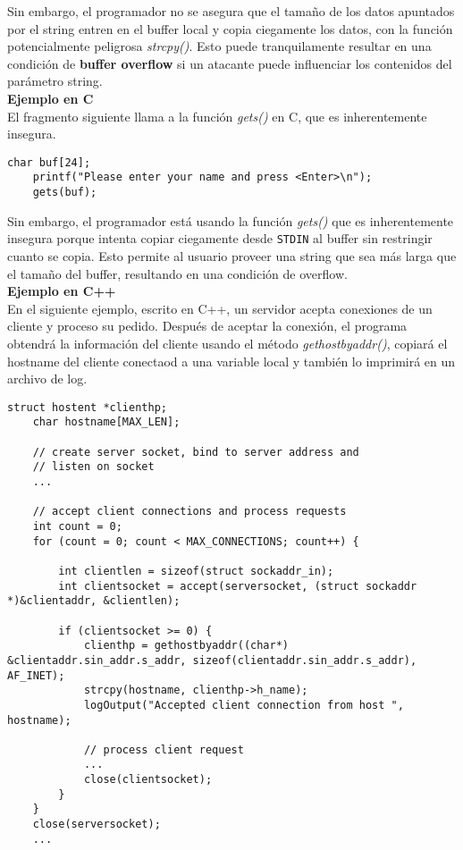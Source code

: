 Sin embargo, el programador no se asegura que el tamaño de los datos apuntados por el string entren en el buffer local y copia ciegamente los datos, con la
función potencialmente peligrosa \textit{strcpy()}. Esto puede tranquilamente resultar en una condición de \textbf{buffer overflow}
si un atacante puede influenciar los contenidos del parámetro string. \\

\noindent \textbf{Ejemplo en C}\\

El fragmento siguiente llama a la función \textit{gets()} en C, que es inherentemente insegura.

\begin{lstlisting}[frame=single]
    char buf[24];
    printf("Please enter your name and press <Enter>\n");
    gets(buf);
\end{lstlisting}

Sin embargo, el programador está usando la función \textit{gets()} que es inherentemente insegura porque intenta copiar ciegamente desde \texttt{STDIN} al buffer sin restringir
cuanto se copia. Esto permite al usuario proveer una string que sea más larga que el tamaño del buffer, resultando en una condición de overflow.\\

\noindent \textbf{Ejemplo en C++}\\

En el siguiente ejemplo, escrito en C++, un servidor acepta conexiones de un cliente y proceso su pedido. Después de aceptar la conexión, el programa obtendrá la información del cliente
usando el método \textit{gethostbyaddr()}, copiará el hostname del cliente conectaod a una variable local y también lo imprimirá en un archivo de log.

\begin{lstlisting}[frame=single]
    struct hostent *clienthp;
    char hostname[MAX_LEN];

    // create server socket, bind to server address and
    // listen on socket
    ...

    // accept client connections and process requests
    int count = 0;
    for (count = 0; count < MAX_CONNECTIONS; count++) {

        int clientlen = sizeof(struct sockaddr_in);
        int clientsocket = accept(serversocket, (struct sockaddr *)&clientaddr, &clientlen);

        if (clientsocket >= 0) {
            clienthp = gethostbyaddr((char*) &clientaddr.sin_addr.s_addr, sizeof(clientaddr.sin_addr.s_addr), AF_INET);
            strcpy(hostname, clienthp->h_name);
            logOutput("Accepted client connection from host ", hostname);

            // process client request
            ...
            close(clientsocket);
        }
    }
    close(serversocket);
    ...
\end{lstlisting}

